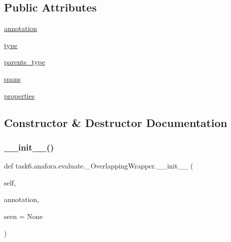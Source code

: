 \subsection*{Public Attributes}
\begin{DoxyCompactItemize}
\item 
\hyperlink{classtask6_1_1anafora_1_1evaluate_1_1__OverlappingWrapper_a40a5e4b7276214d3f41ae0bf14f5ce4a}{annotation}
\item 
\hyperlink{classtask6_1_1anafora_1_1evaluate_1_1__OverlappingWrapper_a6bdb3505eb0775c5a0921d5a1aa91318}{type}
\item 
\hyperlink{classtask6_1_1anafora_1_1evaluate_1_1__OverlappingWrapper_a9c08d4663700d02205b2ff7cc48c3857}{parents\+\_\+type}
\item 
\hyperlink{classtask6_1_1anafora_1_1evaluate_1_1__OverlappingWrapper_a2c0208c4f54e979ee199c4b04b5f90bd}{spans}
\item 
\hyperlink{classtask6_1_1anafora_1_1evaluate_1_1__OverlappingWrapper_a2abf9a148543e366def76e48e60cc8f4}{properties}
\end{DoxyCompactItemize}


\subsection{Constructor \& Destructor Documentation}
\mbox{\label{classtask6_1_1anafora_1_1evaluate_1_1__OverlappingWrapper_a7a77c186e65867fd0388981131701f97}} 
\subsubsection{\texorpdfstring{\+\_\+\+\_\+init\+\_\+\+\_\+()}{\_\_init\_\_()}}
{\footnotesize\ttfamily def task6.\+anafora.\+evaluate.\+\_\+\+Overlapping\+Wrapper.\+\_\+\+\_\+init\+\_\+\+\_\+ (\begin{DoxyParamCaption}\item[{}]{self,  }\item[{}]{annotation,  }\item[{}]{seen = {\ttfamily None} }\end{DoxyParamCaption})}



